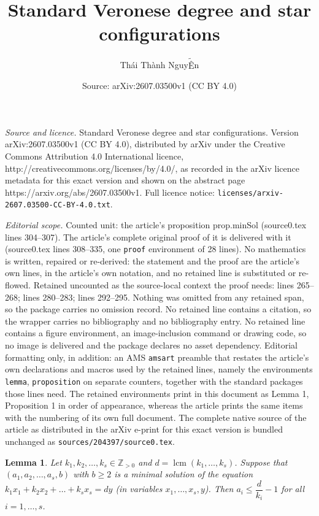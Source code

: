 \documentclass[10pt,a4paper]{amsart}
\title{Standard Veronese degree and star configurations}
\author{Th\'ai Th\`anh Nguy$\tilde{\text{\^E}}$n}
\date{Source: arXiv:2607.03500v1 (CC BY 4.0)}
\newtheorem{lemma}{Lemma}
\newcommand{\ZZ}{{\mathbb Z}}
\DeclareMathOperator{\lcm}{lcm}
\begin{document}
\maketitle

\noindent\emph{Source and licence.} Standard Veronese degree and star configurations. Version arXiv:2607.03500v1 (CC BY 4.0), distributed by arXiv under the Creative Commons Attribution 4.0 International licence, http://creativecommons.org/licenses/by/4.0/, as recorded in the arXiv licence metadata for this exact version and shown on the abstract page https://arxiv.org/abs/2607.03500v1. Full licence notice: \texttt{licenses/arxiv-2607.03500-CC-BY-4.0.txt}.\par\smallskip

\noindent\textit{Editorial scope.} Counted unit: the article's proposition prop.minSol (source0.tex lines 304--307). The article's complete original proof of it is delivered with it (source0.tex lines 308--335, one \texttt{proof} environment of 28 lines). No mathematics is written, repaired or re-derived: the statement and the proof are the article's own lines, in the article's own notation, and no retained line is substituted or re-flowed.  Retained uncounted as the source-local context the proof needs: lines 265--268; lines 280--283; lines 292--295.  Nothing was omitted from any retained span, so the package carries no omission record.  No retained line contains a citation, so the wrapper carries no bibliography and no bibliography entry.  No retained line contains a figure environment, an image-inclusion command or drawing code, so no image is delivered and the package declares no asset dependency.  Editorial formatting only, in addition: an AMS \texttt{amsart} preamble that restates the article's own declarations and macros used by the retained lines, namely the environments \texttt{lemma}, \texttt{proposition} on separate counters, together with the standard packages those lines need.  The retained environments print in this document as Lemma 1, Proposition 1 in order of appearance, whereas the article prints the same items with the numbering of its own full document.  The complete native source of the article as distributed in the arXiv e-print for this exact version is bundled unchanged as \texttt{sources/204397/source0.tex}.
\begin{lemma}
    \label{lem.xi<n}
    Let $k_1,k_2,\ldots,k_s \in \ZZ_{>0}$ and $d=\lcm(k_1,\ldots ,k_s)$. Suppose that $(a_1,a_2,\ldots ,a_s, b)$ with $b\ge 2$ is a minimal solution of the equation $k_1x_1+k_2x_2+\ldots +k_sx_s = dy$ (in variables $x_1,\ldots,x_s,y$). Then $a_i\le \dfrac{d}{k_i}-1$ for all $i=1,\ldots ,s$. 
\end{lemma}
\end{document}
